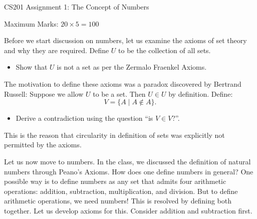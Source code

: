 \documentclass[]{article}
\begin{document}
	\begin{center}
		{\LARGE CS201 Assignment 1: The Concept of Numbers}
	\end{center}
	
	\vspace{3mm}
	{\large \hfill Maximum Marks: $20\times 5 = 100$}
	
	\vspace{10mm}
	
	Before we start discussion on numbers, let us examine the axioms of set theory and why they are required. Define $U$ to be the collection of all sets.
	
	\begin{itemize}
		\item Show that $U$ is not a set as per the Zermalo Fraenkel Axioms.
	\end{itemize}
	
	
The motivation to define these axioms was a paradox discovered by Bertrand Russell: Suppose we allow $U$ to be a set. Then $U\in U$ by definition. Define: \[ V = \{ A \mid A \not\in A\}. \] 

\begin{itemize}
	\item Derive a contradiction using the question ``is $V\in V$?''.
\end{itemize}


This is the reason that circularity in definition of sets was explicitly not permitted by the axioms.

Let us now move to numbers. In the class, we discussed the definition of natural numbers through Peano's Axioms. How does one define numbers in general? One possible way is to define numbers as any set that admits four arithmetic operations: addition, subtraction, multiplication, and division. But to define arithmetic operations, we need numbers! This is resolved by defining both together.
Let us develop axioms for this. Consider addition and subtraction first. 
\end{document}
